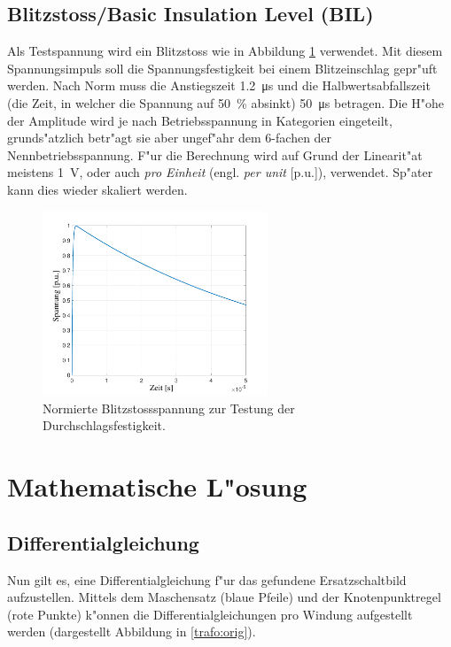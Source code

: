 \begin{refsection}
\subsection{Blitzstoss/\textbf{B}asic \textbf{I}nsulation \textbf{L}evel (BIL)}
%
%
%
Als Testspannung wird ein Blitzstoss wie in Abbildung \ref{trafo:BIL} verwendet. Mit diesem Spannungsimpuls soll die Spannungsfestigkeit bei einem Blitzeinschlag gepr"uft werden. Nach Norm muss die Anstiegszeit \SI{1.2}{\micro \second} und die Halbwertsabfallszeit (die Zeit, in welcher die Spannung auf \SI{50}{\percent} absinkt) \SI{50}{\micro \second} betragen. Die H"ohe der Amplitude wird je nach Betriebsspannung in Kategorien eingeteilt, grunds"atzlich betr"agt sie aber ungef"ahr dem 6-fachen der Nennbetriebsspannung. F"ur die Berechnung wird auf Grund der Linearit"at meistens \SI{1}{\volt}, oder auch \textit{pro Einheit} (engl. \textit{per unit} [p.u.]), verwendet. Sp"ater kann dies wieder skaliert werden.

\begin{figure}
	\centering
	\includegraphics[width=0.6\textwidth]{./trafo/images/pulse.pdf}
	\caption{Normierte Blitzstossspannung zur Testung der Durchschlagsfestigkeit.}
	\label{trafo:BIL}
\end{figure}

\section{Mathematische L"osung}
\subsection{Differentialgleichung}

Nun gilt es, eine Differentialgleichung f"ur das gefundene Ersatzschaltbild aufzustellen. Mittels dem Maschensatz (blaue Pfeile) und der Knotenpunktregel (rote Punkte) k"onnen die Differentialgleichungen pro Windung aufgestellt werden (dargestellt Abbildung in \ref{trafo:orig}).


\end{refsection}
